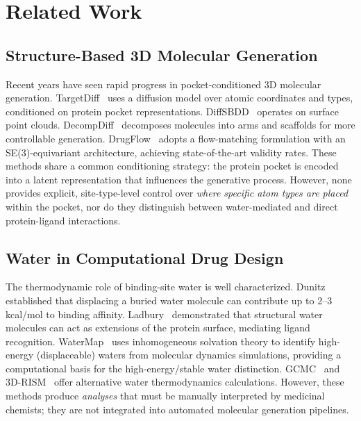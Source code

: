 \documentclass[journal=jcisd,manuscript=article]{achemso}
\begin{document}
\section{Related Work}

\subsection{Structure-Based 3D Molecular Generation}

Recent years have seen rapid progress in pocket-conditioned 3D molecular generation.
TargetDiff~\cite{RN1} uses a diffusion model over atomic coordinates and types,
conditioned on protein pocket representations. DiffSBDD~\cite{RN2} operates on
surface point clouds. DecompDiff~\cite{RN3} decomposes molecules into arms and
scaffolds for more controllable generation. DrugFlow~\cite{RN4} adopts a
flow-matching formulation with an SE(3)-equivariant architecture, achieving
state-of-the-art validity rates. These methods share a common conditioning strategy:
the protein pocket is encoded into a latent representation that influences the
generative process. However, none provides explicit, site-type-level control
over \emph{where specific atom types are placed} within the pocket, nor do they
distinguish between water-mediated and direct protein-ligand interactions.

\subsection{Water in Computational Drug Design}

The thermodynamic role of binding-site water is well characterized. Dunitz~\cite{RN8}
established that displacing a buried water molecule can contribute up to
2--3 kcal/mol to binding affinity. Ladbury~\cite{RN9} demonstrated that structural
water molecules can act as extensions of the protein surface, mediating
ligand recognition. WaterMap~\cite{RN10} uses inhomogeneous solvation theory
to identify high-energy (displaceable) waters from molecular dynamics simulations,
providing a computational basis for the high-energy/stable water distinction.
GCMC~\cite{RN11} and 3D-RISM~\cite{RN12} offer alternative water thermodynamics
calculations. However, these methods produce \emph{analyses} that must be manually
interpreted by medicinal chemists; they are not integrated into automated molecular
generation pipelines.
\end{document}
